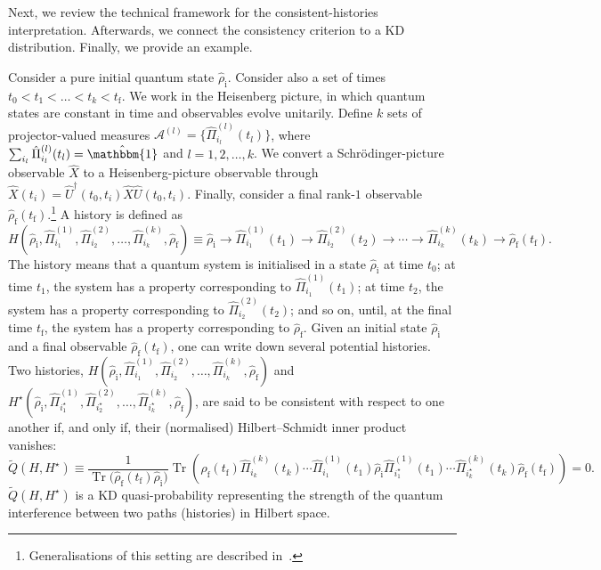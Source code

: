 \documentclass[%
 reprint,
superscriptaddress,
nofootinbib,
bibnotes,
 amsmath,amssymb,
 aps,
]{revtex4-1}
\theoremstyle{plain}
\DeclareMathOperator{\Tr}{Tr}
\begin{document}
Next, we review the technical framework for the consistent-histories interpretation. Afterwards, we connect the consistency criterion to a KD distribution. Finally, we provide an example.

Consider a pure initial quantum state $\hat{\rho}_{\mathrm{i}}$. Consider also a set of times $t_0 < t_1 < \ldots < t_k < t_{\mathrm{f}}$.  We work in the Heisenberg picture, in which quantum states are constant in time and observables evolve unitarily. Define $k$ sets of 
projector-valued measures
$\mathcal{A}^{(l)} = \{ \hat{\Pi}^{(l)}_{i_l}(t_{l}) \} $,   where $\sum_{i_l}  \hat{\Pi}^{(l)}_{i_l}(t_{l}) = \hat{\mathbbm{1}}$ and  $l = 1, 2, \ldots, k$. 
We convert a Schr\"odinger-picture observable $\hat{X}$ to a Heisenberg-picture observable through
$\hat{X}(t_i) = \hat{U}^{\dagger}(t_0,t_i) \hat{X} \hat{U}(t_0,t_i)$.
Finally, consider a final rank-$1$ observable  $\hat{\rho}_{\mathrm{f}}(t_{\mathrm{f}})$.\footnote{Generalisations of this setting are described in~\cite{Griffiths84, Hohenberg10}.} A history is defined as
\begin{equation}
\label{Eq:History}
H\left( \hat{\rho}_{\mathrm{i}},  \hat{\Pi}^{(1)}_{i_1},  \hat{\Pi}^{(2)}_{i_2}, \ldots,  \hat{\Pi}^{(k)}_{i_k}, \hat{\rho}_{\mathrm{f}}  \right)
\equiv
\hat{\rho}_{\mathrm{i}} \rightarrow   \hat{\Pi}^{(1)}_{i_1}(t_{1})  \rightarrow  \hat{\Pi}^{(2)}_{i_2}(t_{2}) \rightarrow \cdots \rightarrow  \hat{\Pi}^{(k)}_{i_k}(t_{k}) \rightarrow \hat{\rho}_{\mathrm{f}} (t_{\mathrm{f}}) .
\end{equation}
The history 
means that a quantum system
is initialised in a state $\hat{\rho}_{\mathrm{i}}$ at time $t_0$; at time $t_1$, 
the system has a property corresponding to $\hat{\Pi}^{(1)}_{i_1}(t_{1}) $;  at time $t_2$, 
the system has a property corresponding to  $ \hat{\Pi}^{(2)}_{i_2}(t_{2})$; and so on, until, at the final time $t_{\mathrm{f}}$, the 
system has a property corresponding to $\hat{\rho}_{\mathrm{f}}$.  Given an initial state $\hat{\rho}_{\mathrm{i}}$ and a final observable $\hat{\rho}_{\mathrm{f}}(t_{\mathrm{f}})$, one can write down several potential histories. Two histories, $H\left( \hat{\rho}_{\mathrm{i}},  \hat{\Pi}^{(1)}_{i_1},  \hat{\Pi}^{(2)}_{i_2}, \ldots,  \hat{\Pi}^{(k)}_{i_k}, \hat{\rho}_{\mathrm{f}} \right)$ and $H^{\star}\left( \hat{\rho}_{\mathrm{i}},  \hat{\Pi}^{(1)}_{i_1^{\star}},  \hat{\Pi}^{(2)}_{i_2^{\star}}, \ldots,  \hat{\Pi}^{(k)}_{i_k^{\star}}, \hat{\rho}_{\mathrm{f}} \right)$, are said to be consistent with respect to one another if, and only if, their (normalised) Hilbert--Schmidt inner product vanishes:
\begin{equation}
\tilde{Q}(H,H^{\star}) 
\equiv \frac{1}{\Tr \bm{(} \hat{\rho}_{\mathrm{f}} ( t_{\mathrm{f}} )  \hat{\rho}_{\mathrm{i}} \bm{)}} 
\Tr \left( \hat{\rho}_{\mathrm{f}} (  t_{\mathrm{f}} )\hat{\Pi}^{(k)}_{i_k}(t_{k})  \cdots  \hat{\Pi}^{(1)}_{i_1}(t_{1}) \hat{\rho}_{\mathrm{i}}  \hat{\Pi}^{(1)}_{i_1^{\star}} (t_{1}) \cdots \hat{\Pi}^{(k)}_{i_k^{\star}} (t_{k}) \hat{\rho}_{\mathrm{f}} (t_{\mathrm{f}}) \right) = 0  .
\end{equation} 
$\tilde{Q}(H,H^{\star})$ is a KD quasi-probability representing the strength of the quantum interference between two paths (histories) in Hilbert space.  
\end{document}
